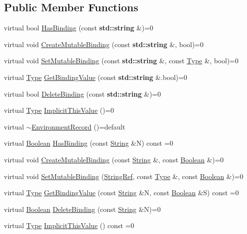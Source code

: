 \subsection*{Public Member Functions}
\begin{DoxyCompactItemize}
\item 
virtual bool \hyperlink{struct_environment_record_aa9e241cd34f23e84ecaa19cf35657e9e}{Has\+Binding} (const \textbf{ std\+::string} \&)=0
\item 
virtual void \hyperlink{struct_environment_record_af5563437dc966f3ad9bbafe951375e23}{Create\+Mutable\+Binding} (const \textbf{ std\+::string} \&, bool)=0
\item 
virtual void \hyperlink{struct_environment_record_a9d5250a9cc6fa4d1f9ecbf5213b6cb24}{Set\+Mutable\+Binding} (const \textbf{ std\+::string} \&, const \hyperlink{class_type}{Type} \&, bool)=0
\item 
virtual \hyperlink{class_type}{Type} \hyperlink{struct_environment_record_afd78e04157f5d84cac025d2b0c867b4e}{Get\+Binding\+Value} (const \textbf{ std\+::string} \&.bool)=0
\item 
virtual bool \hyperlink{struct_environment_record_a41079a3969168b9fc4839fd89aa14dc0}{Delete\+Binding} (const \textbf{ std\+::string} \&)=0
\item 
virtual \hyperlink{class_type}{Type} \hyperlink{struct_environment_record_acef5c0dac3d58cbef25daa495c5d0e00}{Implicit\+This\+Value} ()=0
\item 
virtual \hyperlink{struct_environment_record_a3162aad344051610e1e1fd197d8ca5a2}{$\sim$\+Environment\+Record} ()=default
\item 
virtual \hyperlink{struct_boolean}{Boolean} \hyperlink{struct_environment_record_a4e9bc2438be3466fd0d9607cdbd20225}{Has\+Binding} (const \hyperlink{struct_string}{String} \&N) const =0
\item 
virtual void \hyperlink{struct_environment_record_aded45e79485e73e080980e6ff611dc0d}{Create\+Mutable\+Binding} (const \hyperlink{struct_string}{String} \&, const \hyperlink{struct_boolean}{Boolean} \&)=0
\item 
virtual void \hyperlink{struct_environment_record_ae5268e78f690c5f9eb50d8abe2342fff}{Set\+Mutable\+Binding} (\hyperlink{struct_environment_record_ab67bd5dbacae338473147ec3f753a364}{String\+Ref}, const \hyperlink{class_type}{Type} \&, const \hyperlink{struct_boolean}{Boolean} \&)=0
\item 
virtual \hyperlink{class_type}{Type} \hyperlink{struct_environment_record_a38f1293eb4b23d22c0ee37ffff58dbdb}{Get\+Binding\+Value} (const \hyperlink{struct_string}{String} \&N, const \hyperlink{struct_boolean}{Boolean} \&S) const =0
\item 
virtual \hyperlink{struct_boolean}{Boolean} \hyperlink{struct_environment_record_ac8fe8ad8e0146d5d7e3d9c0f3d873717}{Delete\+Binding} (const \hyperlink{struct_string}{String} \&N)=0
\item 
virtual \hyperlink{class_type}{Type} \hyperlink{struct_environment_record_a9c60c0ab4900f6a8cdc50ceefdbf0507}{Implicit\+This\+Value} () const =0
\end{DoxyCompactItemize}


